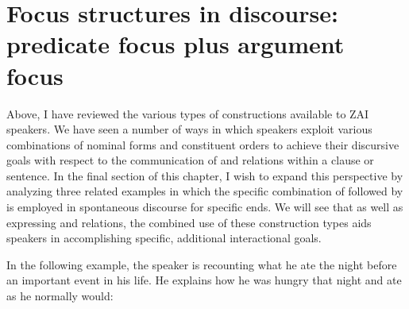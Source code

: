 \section{Focus structures in discourse: predicate focus plus argument focus}\label{chiasmus}

Above, I have reviewed the various types of  constructions available to ZAI speakers. We have seen a number of ways in which speakers exploit various combinations of nominal forms and constituent orders to achieve their discursive goals with respect to the communication of  and  relations within a clause or sentence. In the final section of this chapter, I wish to expand this perspective by analyzing three related examples in which the specific combination of  followed by  is employed in spontaneous discourse for specific ends. We will see that as well as expressing  and  relations, the combined use of these construction types aids speakers in accomplishing specific, additional interactional goals. 

In the following example, the speaker is recounting what he ate the night before an important event in his life. He explains how he was hungry that night and ate as he normally would:

